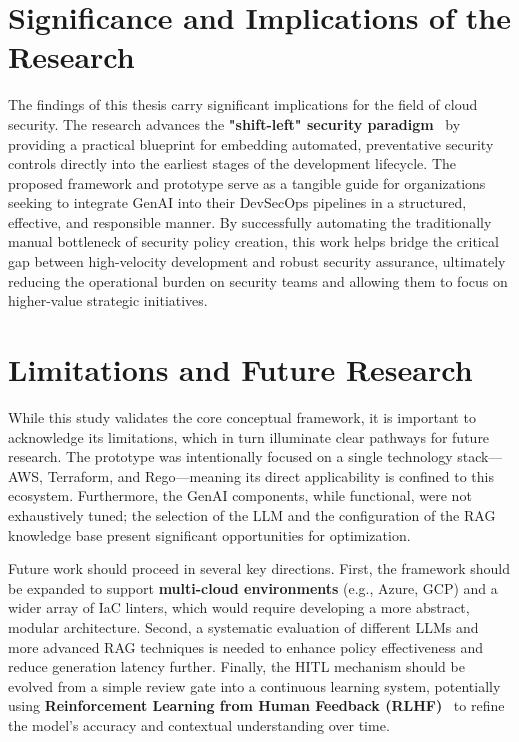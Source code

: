 \section{Significance and Implications of the Research}

The findings of this thesis carry significant implications for the field of cloud security. The research advances the \textbf{"shift-left" security paradigm}~\cite{akto_shift_2025} by providing a practical blueprint for embedding automated, preventative security controls directly into the earliest stages of the development lifecycle. The proposed framework and prototype serve as a tangible guide for organizations seeking to integrate GenAI into their DevSecOps pipelines in a structured, effective, and responsible manner. By successfully automating the traditionally manual bottleneck of security policy creation, this work helps bridge the critical gap between high-velocity development and robust security assurance, ultimately reducing the operational burden on security teams and allowing them to focus on higher-value strategic initiatives.

\section{Limitations and Future Research}

While this study validates the core conceptual framework, it is important to acknowledge its limitations, which in turn illuminate clear pathways for future research. The prototype was intentionally focused on a single technology stack—AWS, Terraform, and Rego—meaning its direct applicability is confined to this ecosystem. Furthermore, the GenAI components, while functional, were not exhaustively tuned; the selection of the LLM and the configuration of the RAG knowledge base present significant opportunities for optimization.

Future work should proceed in several key directions. First, the framework should be expanded to support \textbf{multi-cloud environments} (e.g., Azure, GCP) and a wider array of IaC linters, which would require developing a more abstract, modular architecture. Second, a systematic evaluation of different LLMs and more advanced RAG techniques is needed to enhance policy effectiveness and reduce generation latency further. Finally, the HITL mechanism should be evolved from a simple review gate into a continuous learning system, potentially using \textbf{Reinforcement Learning from Human Feedback (RLHF)}~\cite{ouyang_training_2022} to refine the model's accuracy and contextual understanding over time.

